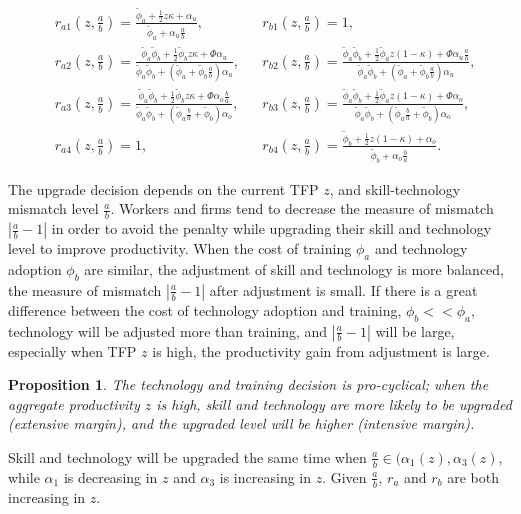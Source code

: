 \documentclass[12pt]{article}
\newtheorem{proposition}{Proposition}
\newcommand{\1}{\mathbb{1}}
\begin{document}
\begin{align*}
&r_{a1}(z,\frac{a}{b}) = \frac{\tilde{\phi}_a+\frac{1}{2}z\kappa+\alpha_u}{\tilde{\phi}_a+\alpha_u\frac{a}{b}}, 
&&r_{b1}(z,\frac{a}{b})= 1,\\
&r_{a2}(z,\frac{a}{b}) = \frac{\tilde{\phi}_a\tilde{\phi}_b+\frac{1}{2}\tilde{\phi}_bz\kappa+\Phi\alpha_u}{\tilde{\phi}_a\tilde{\phi}_b+(\tilde{\phi}_a+\tilde{\phi}_b\frac{a}{b})\alpha_u}, 
&&r_{b2}(z,\frac{a}{b})=  \frac{\tilde{\phi}_a\tilde{\phi}_b+\frac{1}{2}\tilde{\phi}_az(1-\kappa)+\Phi\alpha_u\frac{a}{b}}{\tilde{\phi}_a\tilde{\phi}_b+(\tilde{\phi}_a+\tilde{\phi}_b\frac{a}{b})\alpha_u},\\
&r_{a3}(z,\frac{a}{b}) = \frac{\tilde{\phi}_a\tilde{\phi}_b+\frac{1}{2}\tilde{\phi}_bz\kappa+\Phi\alpha_o\frac{b}{a}}{\tilde{\phi}_a\tilde{\phi}_b+(\tilde{\phi}_a\frac{b}{a}+\tilde{\phi}_b)\alpha_o}, 
&&r_{b3}(z,\frac{a}{b})=  \frac{\tilde{\phi}_a\tilde{\phi}_b+\frac{1}{2}\tilde{\phi}_az(1-\kappa)+\Phi\alpha_o}{\tilde{\phi}_a\tilde{\phi}_b+(\tilde{\phi}_a\frac{b}{a}+\tilde{\phi}_b)\alpha_o},\\
&r_{a4}(z,\frac{a}{b}) = 1, 
&&r_{b4}(z,\frac{a}{b})= \frac{\tilde{\phi}_b+\frac{1}{2}z(1-\kappa)+\alpha_o}{\tilde{\phi}_b+\alpha_o\frac{b}{a}}.
\end{align*}

The upgrade decision depends on the current TFP $z$, and skill-technology mismatch level $\frac{a}{b}$. Workers and firms tend to decrease the measure of mismatch $|\frac{a}{b}-1|$ in order to avoid the penalty while upgrading their skill and technology level to improve productivity. When the cost of training $\phi_a$ and technology adoption $\phi_b$ are similar, the adjustment of skill and technology is more balanced, the measure of mismatch $|\frac{a}{b}-1|$ after adjustment is small. If there is a great difference between the cost of technology adoption and training, $\phi_b<<\phi_a$, technology will be adjusted more than training, and $|\frac{a}{b}-1|$ will be large, especially when TFP $z$ is high, the productivity gain from adjustment is large.    

\begin{proposition}
The technology and training decision is pro-cyclical; when the aggregate productivity $z$ is high, skill and technology are more likely to be upgraded (extensive margin), and the upgraded level will be higher (intensive margin). 
\end{proposition}
Skill and technology will be upgraded the same time when $\frac{a}{b} \in (\alpha_1(z),\alpha_3(z)$, while $\alpha_1$ is decreasing in $z$ and $\alpha_3$ is increasing in $z$. Given $\frac{a}{b}$, $r_{a}$ and $r_{b}$ are both increasing in $z$. 
\end{document}
